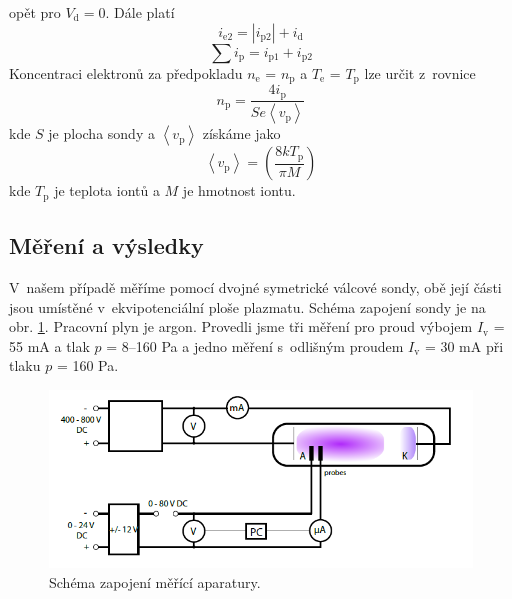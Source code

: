 \documentclass[a4paper,12pt]{article}
\begin{document}
opět pro $V_\text{{d}} = 0$. Dále platí
\begin{equation}
	i_\text{{e2}} = |i_\text{{p2}}| + i_\text{{d}}
	\label{ie2}
\end{equation}
\begin{equation}
	\sum i_\text{{p}} = i_\text{{p1}} + i_\text{{p2}}
	\label{sumaip}
\end{equation}
Koncentraci elektronů za předpokladu $n_\text{{e}}$ = $n_\text{{p}}$
a $T_\text{{e}}$ = $T_\text{{p}}$
lze určit z~rovnice
\begin{equation}
	n_\text{{p}} = \frac{4  i_\text{{p}}}{S e \left\langle v_\text{{p}} 
	\right\rangle }
	\label{ne}
\end{equation}
kde $S$ je plocha sondy a $\left\langle  v_\text{{p}} \right\rangle$ získáme jako
\begin{equation}
	\left\langle v_\text{{p}} \right\rangle = \left( \frac{8 kT_\text{{p}}}{\pi 
	M} \right) 
	\label{vp}
\end{equation}
kde $T_\text{p}$ je teplota iontů a $M$ je hmotnost iontu.

\subsection{Měření a výsledky}
V~našem případě měříme pomocí dvojné symetrické válcové sondy,
obě její části jsou umístěné v~ekvipotenciální ploše plazmatu.
Schéma zapojení sondy je na obr. \ref{zapojenidvojna}. Pracovní
plyn je argon. Provedli jsme tři měření pro proud výbojem  $I_\text{{v}}$ =
55 \si{\milli\ampere} a tlak $p$ = 8--160 \si{\pascal} a jedno
měření s~odlišným proudem $I_\text{{v}}$ =
30 \si{\milli\ampere} při tlaku $p$ = 160 \si{\pascal}.

\begin{figure}[h]
	\centering
	\includegraphics[width=130mm]{zapojenidvojna.png}
	\caption{Schéma zapojení měřící aparatury.}
	\label{zapojenidvojna}
\end{figure}
\end{document}
